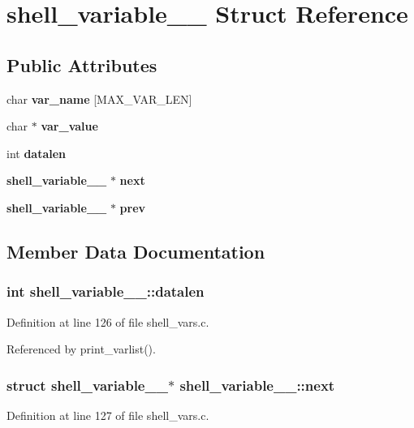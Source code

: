 \section{shell\_\-variable\_\-\_\- Struct Reference}
\label{structshell__variable____}
\subsection*{Public Attributes}
\begin{CompactItemize}
\item 
char {\bf var\_\-name} [MAX\_\-VAR\_\-LEN]
\item 
char $\ast$ {\bf var\_\-value}
\item 
int {\bf datalen}
\item 
{\bf shell\_\-variable\_\-\_\-} $\ast$ {\bf next}
\item 
{\bf shell\_\-variable\_\-\_\-} $\ast$ {\bf prev}
\end{CompactItemize}


\subsection{Member Data Documentation}
\subsubsection{\setlength{\rightskip}{0pt plus 5cm}int {\bf shell\_\-variable\_\-\_\-::datalen}}\label{structshell__variable_____o2}




Definition at line 126 of file shell\_\-vars.c.

Referenced by print\_\-varlist().
\subsubsection{\setlength{\rightskip}{0pt plus 5cm}struct {\bf shell\_\-variable\_\-\_\-}$\ast$ {\bf shell\_\-variable\_\-\_\-::next}}\label{structshell__variable_____o3}




Definition at line 127 of file shell\_\-vars.c.
